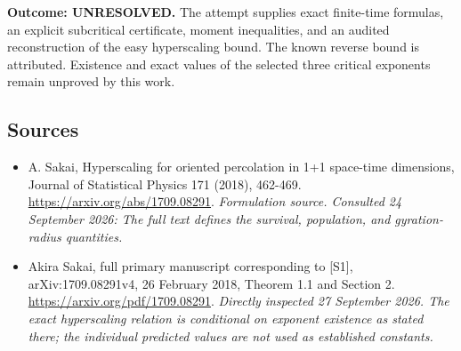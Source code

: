 \documentclass[11pt]{article}
\begin{document}
\textbf{Outcome: UNRESOLVED.} The attempt supplies exact finite-time
formulas, an explicit subcritical certificate, moment inequalities, and
an audited reconstruction of the easy hyperscaling bound. The known
reverse bound is attributed. Existence and exact values of the selected
three critical exponents remain unproved by this work.

\subsection{Sources}
\begin{itemize}
\item[S1]A. Sakai, Hyperscaling for oriented percolation in 1+1 space-time dimensions, Journal of Statistical Physics 171 (2018), 462-469.
\url{https://arxiv.org/abs/1709.08291}.
\textit{Formulation source. Consulted 24 September 2026: The full text defines the survival, population, and gyration-radius quantities.}
\item[E1]Akira Sakai, full primary manuscript corresponding to [S1],
arXiv:1709.08291v4, 26 February 2018, Theorem 1.1 and Section 2.
\url{https://arxiv.org/pdf/1709.08291}.
\textit{Directly inspected 27 September 2026. The exact hyperscaling
relation is conditional on exponent existence as stated there; the
individual predicted values are not used as established constants.}

\end{itemize}
\end{document}
